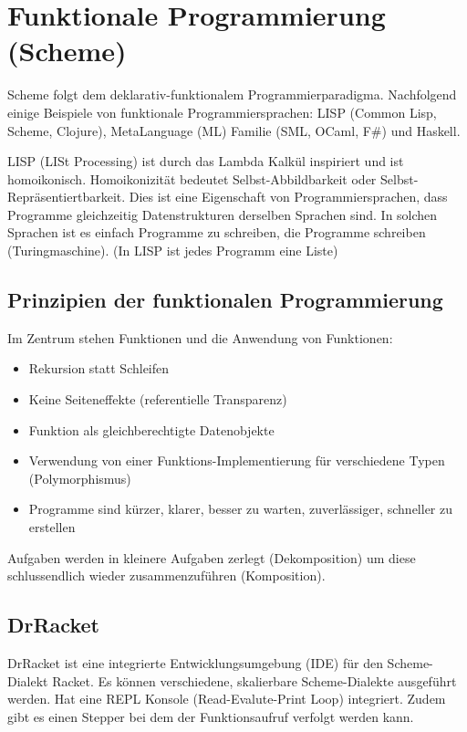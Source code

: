 \chapter{Funktionale Programmierung (Scheme)}
Scheme folgt dem deklarativ-funktionalem Programmierparadigma. Nachfolgend einige Beispiele von funktionale Programmiersprachen: LISP (Common Lisp, Scheme, Clojure), MetaLanguage (ML) Familie (SML, OCaml, F\#) und Haskell.

LISP (LISt Processing) ist durch das Lambda Kalkül inspiriert und ist homoikonisch. Homoikonizität bedeutet Selbst-Abbildbarkeit oder Selbst-Repräsentiertbarkeit. Dies ist eine Eigenschaft von Programmiersprachen, dass Programme gleichzeitig Datenstrukturen derselben Sprachen sind. In solchen Sprachen ist es einfach Programme zu schreiben, die Programme schreiben (Turingmaschine). (In LISP ist jedes Programm eine Liste)

\section{Prinzipien der funktionalen Programmierung}
Im Zentrum stehen Funktionen und die Anwendung von Funktionen:
\begin{itemize}
	\item Rekursion statt Schleifen
	\item Keine Seiteneffekte (referentielle Transparenz)
	\item Funktion als gleichberechtigte Datenobjekte
	\item Verwendung von einer Funktions-Implementierung für verschiedene Typen (Polymorphismus)
	\item Programme sind kürzer, klarer, besser zu warten, zuverlässiger, schneller zu erstellen
\end{itemize}
Aufgaben werden in kleinere Aufgaben zerlegt (Dekomposition) um diese schlussendlich wieder zusammenzuführen (Komposition).

\section{DrRacket}
DrRacket ist eine integrierte Entwicklungsumgebung (IDE) für den Scheme-Dialekt Racket. Es können verschiedene, skalierbare Scheme-Dialekte ausgeführt werden. Hat eine REPL Konsole (Read-Evalute-Print Loop) integriert. Zudem gibt es einen Stepper bei dem der Funktionsaufruf verfolgt werden kann.

